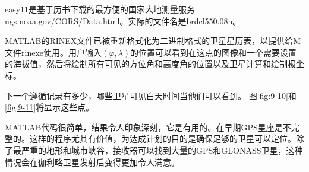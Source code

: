 		easy11是基于历书下载的最方便的国家大地测量服务ngs.noaa.gov/CORS/Data.html。实际的文件名是brdcl550.08n。
		
		MATLAB的RINEX文件已被重新格式化为二进制格式的卫星星历表，以提供给M文件rinexe使用。用户输入$(\varphi,\lambda)$的位置可以看到在这点的图像和一个需要设置的海拔值，然后将绘制所有可见的方位角和高度角的位置以及卫星计算和绘制极坐标。
		
		下一个遵循记录有多少，哪些卫星可见白天时间当他们可以看到。 图\ref{fig:9-10}和\ref{fig:9-11}将显示这些点。
		
		MATLAB代码很简单，结果令人印象深刻，它是有用的。在早期GPS星座是不完整的。这样的程序尤其有价值，为达成计划的目的是确保足够的卫星可以定位。除了最严重的地形和城市峡谷，接收器可以找到大量的GPS和GLONASS卫星，这种情况会在伽利略卫星发射后变得更加令人满意。
	
